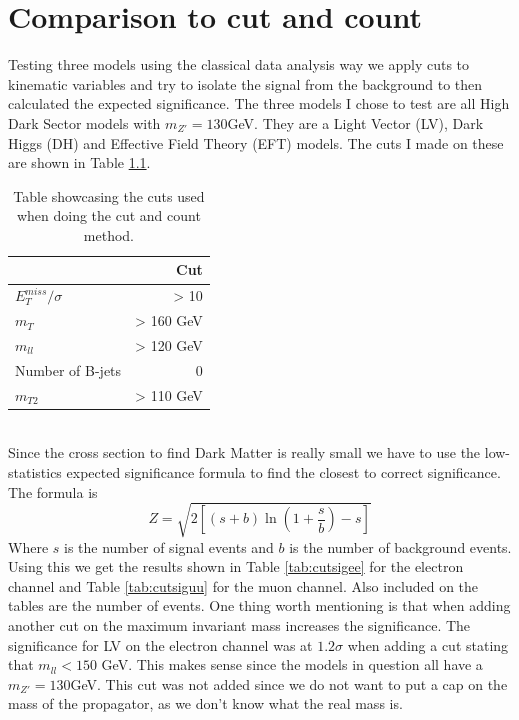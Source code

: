 \documentclass[14pt, a4paper]{book}
\begin{document}
\chapter{Comparison to cut and count}
Testing three models using the classical data analysis way we apply cuts to kinematic variables and try to isolate the signal from the background to then calculated the expected significance. The three models I chose to test are all High Dark Sector models with $m_{Z'}=130$GeV. They are a Light Vector (LV), Dark Higgs (DH) and Effective Field Theory (EFT) models. The cuts I made on these are shown in Table \ref{tab:cuts}.
\begin{table}[!h]
    \centering
    \caption[Cut and count cuts]{Table showcasing the cuts used when doing the cut and count method.}
    \begin{tabular}{l|r}\midrule\midrule
                                & Cut\\\midrule
         $E_T^{miss}/\sigma$    & > 10      \\
         $m_T$                  & > 160 GeV \\
         $m_{ll}$               & > 120 GeV \\
         Number of B-jets       & 0         \\
         $m_{T2}$               & > 110 GeV \\\midrule\midrule
    \end{tabular}
    \label{tab:cuts}
\end{table}
\\ Since the cross section to find Dark Matter is really small we have to use the low-statistics expected significance formula to find the closest to correct significance. The formula is
\begin{equation}\label{eq:low_stat_Z}
    Z = \sqrt{2\left[(s + b)\ln(1 + \frac{s}{b}) - s \right]}
\end{equation}
Where $s$ is the number of signal events and $b$ is the number of background events. Using this we get the results shown in Table \ref{tab:cutsigee} for the electron channel and Table \ref{tab:cutsiguu} for the muon channel. Also included on the tables are the number of events. One thing worth mentioning is that when adding another cut on the maximum invariant mass increases the significance. The significance for LV on the electron channel was at $1.2\sigma$ when adding a cut stating that $m_{ll}<150$ GeV. This makes sense since the models in question all have a $m_{Z'}=130$GeV. This cut was not added since we do not want to put a cap on the mass of the propagator, as we don't know what the real mass is.
\end{document}

